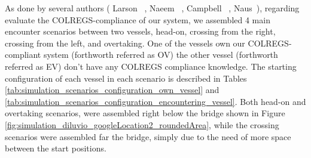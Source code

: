     As done by several authors (\eg{} Larson \etal{}~\cite{Larson2006Autonomous}, Naeem \etal{}~\cite{Naeem2012COLREGS}, Campbell \etal{}~\cite{Campbell2013Automatic}, Naus~\cite{Naus2013Idea}), regarding evaluate the \ac{COLREGS}-compliance of our system, we assembled 4 main encounter scenarios between two vessels, head-on, crossing from the right, crossing from the left, and overtaking. One of the vessels own our \ac{COLREGS}-compliant system (forthworth referred as \acl{OV}) the other vessel (forthworth referred as \acl{EV}) don't have any \ac{COLREGS} compliance knowledge. The starting configuration of each vessel in each scenario is described in Tables \ref{tab:simulation_scenarios_configuration_own_vessel} and \ref{tab:simulation_scenarios_configuration_encountering_vessel}. Both head-on and overtaking scenarios, were assembled right below the bridge shown in Figure \ref{fig:simulation_diluvio_googleLocation2_roundedArea}, while the crossing scenarios were assembled far the bridge, simply due to the need of more space between the start positions.

    
